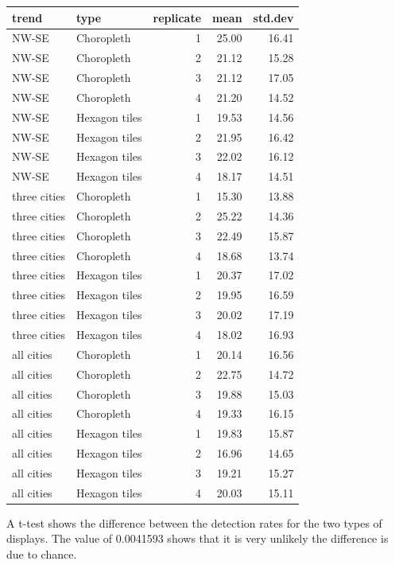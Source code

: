 \documentclass[conference,final,]{IEEEtran}
\begin{document}
\begin{tabular}{l|l|r|r|r}
\hline
trend & type & replicate & mean & std.dev\\
\hline
NW-SE & Choropleth & 1 & 25.00 & 16.41\\
\hline
NW-SE & Choropleth & 2 & 21.12 & 15.28\\
\hline
NW-SE & Choropleth & 3 & 21.12 & 17.05\\
\hline
NW-SE & Choropleth & 4 & 21.20 & 14.52\\
\hline
NW-SE & Hexagon tiles & 1 & 19.53 & 14.56\\
\hline
NW-SE & Hexagon tiles & 2 & 21.95 & 16.42\\
\hline
NW-SE & Hexagon tiles & 3 & 22.02 & 16.12\\
\hline
NW-SE & Hexagon tiles & 4 & 18.17 & 14.51\\
\hline
three cities & Choropleth & 1 & 15.30 & 13.88\\
\hline
three cities & Choropleth & 2 & 25.22 & 14.36\\
\hline
three cities & Choropleth & 3 & 22.49 & 15.87\\
\hline
three cities & Choropleth & 4 & 18.68 & 13.74\\
\hline
three cities & Hexagon tiles & 1 & 20.37 & 17.02\\
\hline
three cities & Hexagon tiles & 2 & 19.95 & 16.59\\
\hline
three cities & Hexagon tiles & 3 & 20.02 & 17.19\\
\hline
three cities & Hexagon tiles & 4 & 18.02 & 16.93\\
\hline
all cities & Choropleth & 1 & 20.14 & 16.56\\
\hline
all cities & Choropleth & 2 & 22.75 & 14.72\\
\hline
all cities & Choropleth & 3 & 19.88 & 15.03\\
\hline
all cities & Choropleth & 4 & 19.33 & 16.15\\
\hline
all cities & Hexagon tiles & 1 & 19.83 & 15.87\\
\hline
all cities & Hexagon tiles & 2 & 16.96 & 14.65\\
\hline
all cities & Hexagon tiles & 3 & 19.21 & 15.27\\
\hline
all cities & Hexagon tiles & 4 & 20.03 & 15.11\\
\hline
\end{tabular}

A t-test shows the difference between the detection rates for the two
types of displays. The value of 0.0041593 shows that it is very unlikely
the difference is due to chance.
\end{document}
